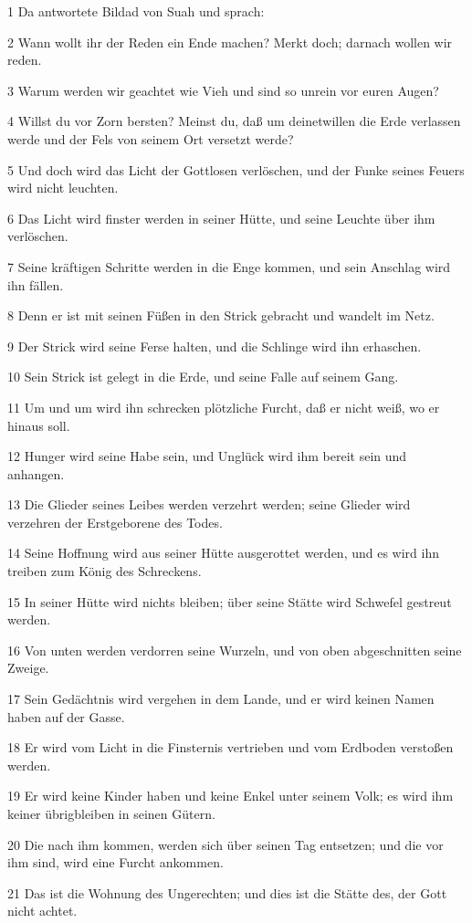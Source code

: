 \par 1 Da antwortete Bildad von Suah und sprach:
\par 2 Wann wollt ihr der Reden ein Ende machen? Merkt doch; darnach wollen wir reden.
\par 3 Warum werden wir geachtet wie Vieh und sind so unrein vor euren Augen?
\par 4 Willst du vor Zorn bersten? Meinst du, daß um deinetwillen die Erde verlassen werde und der Fels von seinem Ort versetzt werde?
\par 5 Und doch wird das Licht der Gottlosen verlöschen, und der Funke seines Feuers wird nicht leuchten.
\par 6 Das Licht wird finster werden in seiner Hütte, und seine Leuchte über ihm verlöschen.
\par 7 Seine kräftigen Schritte werden in die Enge kommen, und sein Anschlag wird ihn fällen.
\par 8 Denn er ist mit seinen Füßen in den Strick gebracht und wandelt im Netz.
\par 9 Der Strick wird seine Ferse halten, und die Schlinge wird ihn erhaschen.
\par 10 Sein Strick ist gelegt in die Erde, und seine Falle auf seinem Gang.
\par 11 Um und um wird ihn schrecken plötzliche Furcht, daß er nicht weiß, wo er hinaus soll.
\par 12 Hunger wird seine Habe sein, und Unglück wird ihm bereit sein und anhangen.
\par 13 Die Glieder seines Leibes werden verzehrt werden; seine Glieder wird verzehren der Erstgeborene des Todes.
\par 14 Seine Hoffnung wird aus seiner Hütte ausgerottet werden, und es wird ihn treiben zum König des Schreckens.
\par 15 In seiner Hütte wird nichts bleiben; über seine Stätte wird Schwefel gestreut werden.
\par 16 Von unten werden verdorren seine Wurzeln, und von oben abgeschnitten seine Zweige.
\par 17 Sein Gedächtnis wird vergehen in dem Lande, und er wird keinen Namen haben auf der Gasse.
\par 18 Er wird vom Licht in die Finsternis vertrieben und vom Erdboden verstoßen werden.
\par 19 Er wird keine Kinder haben und keine Enkel unter seinem Volk; es wird ihm keiner übrigbleiben in seinen Gütern.
\par 20 Die nach ihm kommen, werden sich über seinen Tag entsetzen; und die vor ihm sind, wird eine Furcht ankommen.
\par 21 Das ist die Wohnung des Ungerechten; und dies ist die Stätte des, der Gott nicht achtet.

